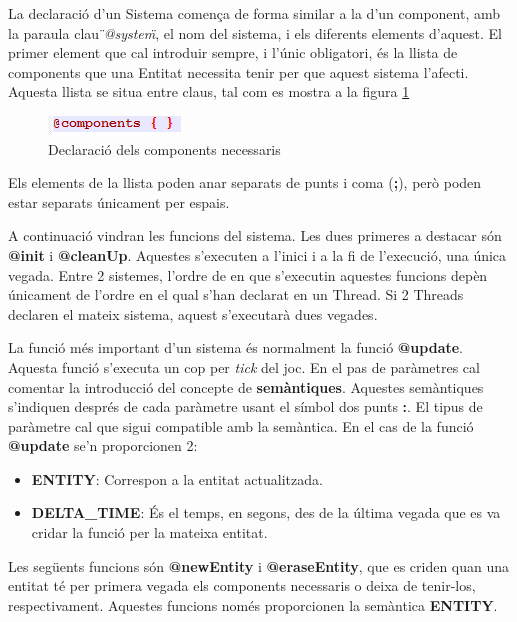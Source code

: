La declaració d'un Sistema comença de forma similar a la d'un component, amb la paraula clau {\em \"{}@system\"{}}, el nom del sistema, i els diferents elements d'aquest. El primer element que cal introduir sempre, i l'únic obligatori, és la llista de components que una Entitat necessita tenir per que aquest sistema l'afecti. Aquesta llista se situa entre claus, tal com es mostra a la figura \ref{fig:ExempleSystem2}


\begin{figure}[h!]
  \includegraphics{./img/ExempleSystem2.png}
  \caption{Declaració dels components necessaris \label{fig:ExempleSystem2}}
\end{figure}

Els elements de la llista poden anar separats de punts i coma ({\bf ;}), però poden estar separats únicament per espais.

A continuació vindran les funcions del sistema. Les dues primeres a destacar són {\bf @init} i {\bf @cleanUp}. Aquestes s'executen a l'inici i a la fi de l'execució, una única vegada. Entre 2 sistemes, l'ordre de en que s'executin aquestes funcions depèn únicament de l'ordre en el qual s'han declarat en un Thread. Si 2 Threads declaren el mateix sistema, aquest s'executarà dues vegades.

La funció més important d'un sistema és normalment la funció {\bf @update}. Aquesta funció s'executa un cop per {\em tick} del joc. En el pas de paràmetres cal comentar la introducció del concepte de {\bf semàntiques}. Aquestes semàntiques s'indiquen després de cada paràmetre usant el símbol dos punts {\bf :}. El tipus de paràmetre cal que sigui compatible amb la semàntica. En el cas de la funció {\bf @update} se'n proporcionen 2:

\begin{itemize}
  \item {\bf ENTITY}: Correspon a la entitat actualitzada.
  \item {\bf DELTA\_TIME}: És el temps, en segons, des de la última vegada que es va cridar la funció per la mateixa entitat.
\end{itemize}

Les següents funcions són {\bf @newEntity} i {\bf @eraseEntity}, que es criden quan una entitat té per primera vegada els components necessaris o deixa de tenir-los, respectivament. Aquestes funcions només proporcionen la semàntica {\bf ENTITY}.

